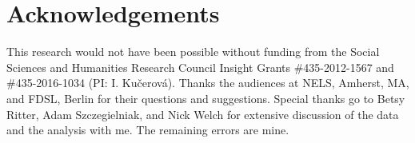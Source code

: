 \documentclass[output=paper,
modfonts
newtxmath,
hidelinks
]{langscibook}
\begin{document}
\newpage
\section*{Acknowledgements}
This research would not have been possible without funding from the Social Sciences and Humanities Research Council Insight Grants \#435-2012-1567 and \#435-2016-1034  (PI: I. Kučerová). Thanks the audiences at NELS, Amherst, MA, and FDSL, Berlin for their questions and suggestions. Special thanks go to Betsy Ritter, Adam Szczegielniak, and Nick Welch for extensive discussion of the data and the analysis with me. The remaining errors are mine.

\sloppy
\printbibliography[heading=subbibliography,notkeyword=this]
\end{document}
